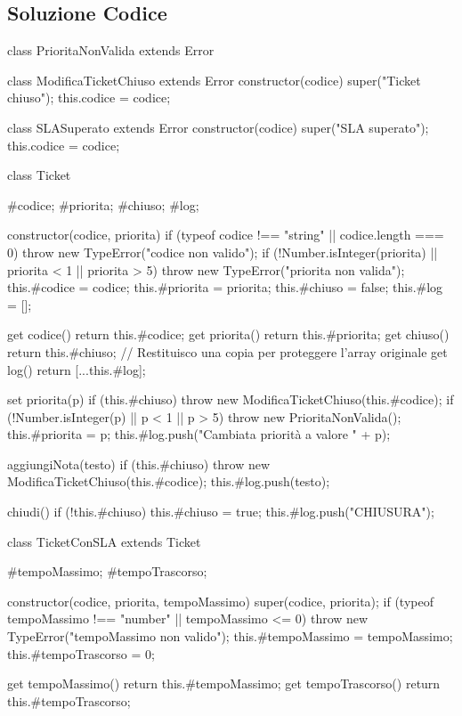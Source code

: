 \subsection{Soluzione Codice}
\begin{jsbox}[title={Soluzione Esercizio 2 - Classi ed Eccezioni}]
class PrioritaNonValida extends Error {}

class ModificaTicketChiuso extends Error {
  constructor(codice) {
    super("Ticket chiuso");
    this.codice = codice;
  }
}

class SLASuperato extends Error {
  constructor(codice) {
    super("SLA superato");
    this.codice = codice;
  }
}

class Ticket {
  #codice;
  #priorita;
  #chiuso;
  #log;

  constructor(codice, priorita) {
    if (typeof codice !== "string" || codice.length === 0) {
      throw new TypeError("codice non valido");
    }
    if (!Number.isInteger(priorita) || priorita < 1 || priorita > 5) {
      throw new TypeError("priorita non valida");
    }
    this.#codice = codice;
    this.#priorita = priorita;
    this.#chiuso = false;
    this.#log = [];
  }

  get codice() { return this.#codice; }
  get priorita() { return this.#priorita; }
  get chiuso() { return this.#chiuso; }
  // Restituisco una copia per proteggere l'array originale
  get log() { return [...this.#log]; }

  set priorita(p) {
    if (this.#chiuso) {
      throw new ModificaTicketChiuso(this.#codice);
    }
    if (!Number.isInteger(p) || p < 1 || p > 5) {
      throw new PrioritaNonValida();
    }
    this.#priorita = p;
    this.#log.push("Cambiata priorità a valore " + p);
  }

  aggiungiNota(testo) {
    if (this.#chiuso) {
      throw new ModificaTicketChiuso(this.#codice);
    }
    this.#log.push(testo);
  }

  chiudi() {
    if (!this.#chiuso) {
      this.#chiuso = true;
      this.#log.push("CHIUSURA");
    }
  }
}

class TicketConSLA extends Ticket {
  #tempoMassimo;
  #tempoTrascorso;

  constructor(codice, priorita, tempoMassimo) {
    super(codice, priorita);
    if (typeof tempoMassimo !== "number" || tempoMassimo <= 0) {
      throw new TypeError("tempoMassimo non valido");
    }
    this.#tempoMassimo = tempoMassimo;
    this.#tempoTrascorso = 0;
  }

  get tempoMassimo() { return this.#tempoMassimo; }
  get tempoTrascorso() { return this.#tempoTrascorso; }

}
\end{jsbox}

